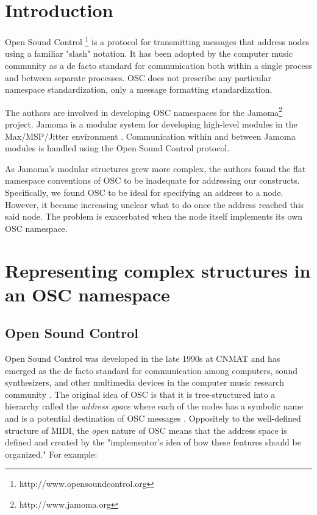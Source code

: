 \documentclass{sig-alternate}
\begin{document}




\section{Introduction} %
\label{sec:introduction}

Open Sound Control \footnote{http://www.opensoundcontrol.org} is a protocol for transmitting messages that address nodes using a familiar "slash" notation.  It has been adopted by the computer music community as a de facto standard for communication both within a single process and between separate processes.  OSC does not prescribe any particular namespace standardization, only a message formatting standardization.

The authors are involved in developing OSC namespaces for the Jamoma\footnote{http://www.jamoma.org} project.
Jamoma is a modular system for developing high-level modules in the Max/MSP/Jitter environment \cite{Place:2006}.  Communication within and between Jamoma modules is handled using the Open Sound Control protocol. 

As Jamoma's modular structures grew more complex, the authors found the flat namespace conventions of OSC to be inadequate for addressing our constructs.  Specifically, we found OSC to be ideal for specifying an address to a node.  However, it became increasing unclear what to do once the address reached this said node.  The problem is exacerbated when the node itself implements its own OSC namespace.





\section{Representing complex structures in an OSC namespace} %
\label{sec:representing_complex_structures_in_an_OSC_namespace}


\subsection{Open Sound Control}

Open Sound Control was developed in the late 1990s at CNMAT and has emerged as the de facto standard for communication among computers, sound synthesizers, and other multimedia devices in the computer music research community \cite{Wright:2003}. The original idea of OSC is that it is tree-structured into a hierarchy called the \emph{address space} where each of the nodes has a symbolic name and is a potential destination of OSC messages \cite{Wright:2003}. Oppositely to the well-defined structure of MIDI, the \emph{open} nature of OSC means that the address space is defined and created by the "implementor’s idea of how these features should be organized." For example:
\end{document}
